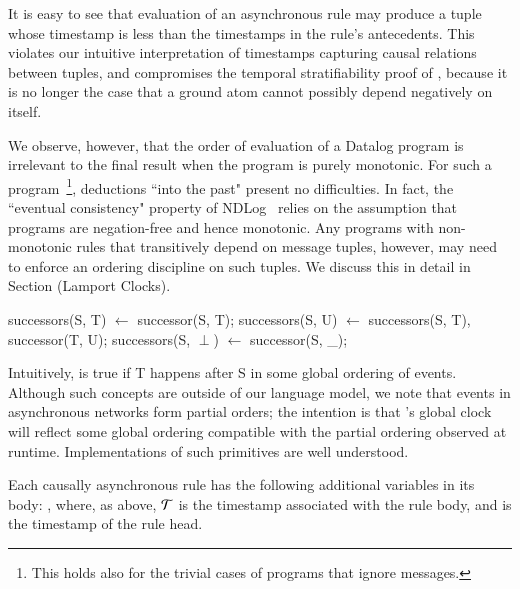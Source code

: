 It is easy to see that evaluation of an asynchronous rule may produce a tuple whose timestamp is less than the timestamps
in the rule's antecedents.  This violates our intuitive interpretation of timestamps capturing causal relations between 
tuples, and compromises the temporal stratifiability proof of \slang, because it is no longer the case that a ground atom
cannot possibly depend negatively on itself.

We observe, however, that the order of evaluation of a Datalog program is irrelevant to the final result when the program is 
purely monotonic.  For such a program~\footnote{This holds also for the trivial cases of programs that ignore messages.}, 
deductions ``into the past" present no difficulties.
In fact, the ``eventual consistency" property of NDLog~\cite{loo-sigmod06} relies on the assumption that
programs are negation-free and hence monotonic.  Any programs with non-monotonic rules that transitively depend on
message tuples, however, may need to enforce an ordering discipline on such tuples.  We discuss this in detail in Section (Lamport Clocks).




\begin{Dedalus}
successors(S, T) \(\leftarrow\) successor(S, T);
successors(S, U) \(\leftarrow\) successors(S, T), successor(T, U);
successors(S, \(\perp\)) \(\leftarrow\) successor(S, _);
\end{Dedalus}

Intuitively,  is true if T happens after S
in some global ordering of events.  Although such concepts are outside
of our language model, we note that events in asynchronous networks
form partial orders; the intention is that \lang's global clock will
reflect some global ordering compatible with the partial ordering
observed at runtime.  Implementations of such primitives are well
understood.

Each causally asynchronous rule has the following additional variables in its
body: , where, as above,
$\Tau$ is the timestamp associated with the rule body, and
 is the timestamp of the rule head.








